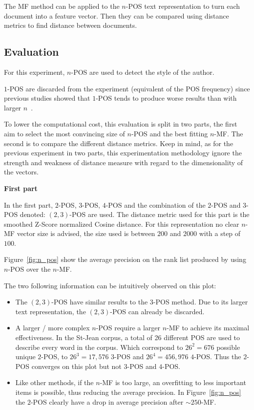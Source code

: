 The MF method can be applied to the $n$-POS text representation to turn each document into a feature vector.
Then they can be compared using distance metrics to find distance between documents.

\subsection{Evaluation}

For this experiment, $n$-POS are used to detect the style of the author.

$1$-POS are discarded from the experiment (equivalent of the POS frequency) since previous studies showed that $1$-POS tends to produce worse results than with larger $n$~\cite{kocher_linking}.

To lower the computational cost, this evaluation is split in two parts, the first aim to select the most convincing size of $n$-POS and the best fitting $n$-MF.
The second is to compare the different distance metrics.
Keep in mind, as for the previous experiment in two parts, this experimentation methodology ignore the strength and weakness of distance measure with regard to the dimensionality of the vectors.

\textbf{First part}

In the first part, $2$-POS, $3$-POS, $4$-POS and the combination of the $2$-POS and $3$-POS denoted: $(2, 3)$-POS are used.
The distance metric used for this part is the smoothed Z-Score normalized Cosine distance.
For this representation no clear $n$-MF vector size is advised, the size used is between $200$ and $2000$ with a step of $100$.

Figure~\ref{fig:n_pos} show the average precision on the rank list produced by using $n$-POS over the $n$-MF.

The two following information can be intuitively observed on this plot:
\begin{itemize}
  \item
  The $(2, 3)$-POS have similar results to the $3$-POS method.
  Due to its larger text representation, the $(2, 3)$-POS can already be discarded.
  \item
  A larger / more complex $n$-POS require a larger $n$-MF to achieve its maximal effectiveness.
  In the St-Jean corpus, a total of 26 different POS are used to describe every word in the corpus.
  Which correspond to $26^2 = 676$ possible unique $2$-POS, to $26^3 = 17,576$ $3$-POS and $26^4 = 456,976$ $4$-POS.
  Thus the $2$-POS converges on this plot but not $3$-POS and $4$-POS.
  \item
  Like other methods, if the $n$-MF is too large, an overfitting to less important items is possible, thus reducing the average precision.
  In Figure~\ref{fig:n_pos} the $2$-POS clearly have a drop in average precision after $\sim 250$-MF.
\end{itemize}

